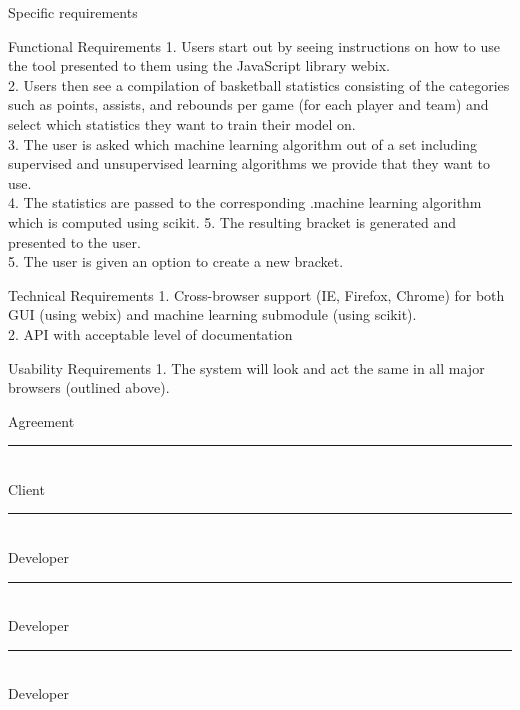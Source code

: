 \documentclass[letterpaper, 10pt,titlepage]{article}
\begin{document}
\newpage


\begin{section}{Specific requirements}
\end{section}

\begin{section}{Functional Requirements}
1.	Users start out by seeing instructions on how to use the tool presented to them using the JavaScript library webix. \\
2.	Users then see a compilation of basketball statistics consisting of the categories such as points, assists, and rebounds per game (for each player and team) and select which statistics they want to train their model on. \\
3.   	The user is asked which machine learning algorithm out of a set including supervised and unsupervised learning algorithms we provide that they want to use. \\
4.      The statistics are passed to the corresponding .machine learning algorithm which is computed using scikit. 
5. 	The resulting bracket is generated and presented to the user. \\
5.      The user is given an option to create a new bracket. \\


\end{section}

\begin{section}{Technical Requirements}
1.       Cross-browser support (IE, Firefox, Chrome) for both GUI (using webix) and machine learning submodule (using scikit). \\
2.       API with acceptable level of documentation \\


\end{section}

\begin{section}{Usability Requirements}
1.       The system will look and act the same in all major browsers (outlined above). \\


\end{section}





\newpage
\begin{section}{Agreement}
\textbf{ }
\vspace{5.0cm}

\noindent\rule{13cm}{0.4pt}\\
Client
\vspace{3.0cm}

\noindent\rule{13cm}{0.4pt}\\
Developer
\vspace{3.0cm}


\noindent\rule{13cm}{0.4pt}\\
Developer
\vspace{3.0cm}


\noindent\rule{13cm}{0.4pt}\\
Developer
\vspace{3.0cm}

\end{section}
\end{document}
